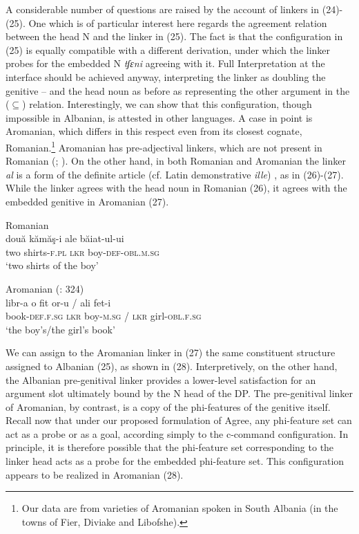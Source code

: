\documentclass[output=paper]{langsci/langscibook}
\begin{document}
A considerable number of questions are raised by the account of linkers in (24)-(25). One which is of particular interest here regards the agreement relation between the head N and the linker in (25). The fact is that the configuration in (25) is equally compatible with a different derivation, under which the linker probes for the embedded N \textit{tʃɛni} agreeing with it. Full Interpretation at the interface should be achieved anyway, interpreting the linker as doubling the genitive – and the head noun as before as representing the other argument in the ($\subseteq$) relation. Interestingly, we can show that this configuration, though impossible in Albanian, is attested in other languages. A case in point is Aromanian, which differs in this respect even from its closest cognate, Romanian.\footnote{Our data are from varieties of Aromanian spoken in South Albania (in the towns of Fier, Diviake and Libofshe).} Aromanian has pre-adjectival linkers, which are not present in Romanian (\citealt{Campos2008}; \citealt{Cornilescu2013}). On the other hand, in both Romanian and Aromanian the linker \textit{al} is a form of the definite article (cf. Latin demonstrative \textit{ille}) \citep{Giurgea2012}, as in (26)-(27). While the linker agrees with the head noun in Romanian (26), it agrees with the embedded genitive in Aromanian (27).

\ea%
         Romanian\label{ex:manzini:26}\\
    \gll două   kămăş-i   ale   băiat-ul-ui     \\
         two   shirts-\textsc{f.pl}  \textsc{lkr}  boy-\textsc{def-obl.m.sg}   \\
    \glt ‘two shirts of the boy’ 
    \z


\ea%
         Aromanian (\citealt{Franco2015}: 324) \label{ex:manzini:27}\\
    \gll libr-a       o   {fit or-u} /  ali   fet-i     \\
         book-\textsc{def.f.sg}   \textsc{lkr}  boy\textsc{{}-m.sg} /   \textsc{lkr}  girl-\textsc{obl.f.sg}   \\
    \glt ‘the boy’s/the girl’s book’
    \z


We can assign to the Aromanian linker in (27) the same constituent structure assigned to Albanian (25), as shown in (28). Interpretively, on the other hand, the Albanian pre-genitival linker provides a lower-level satisfaction for an argument slot ultimately bound by the N head of the DP. The pre-genitival linker of Aromanian, by contrast, is a copy of the phi-features of the genitive itself. Recall now that under our proposed formulation of Agree, any phi-feature set can act as a probe or as a goal, according simply to the c-command configuration. In principle, it is therefore possible that the phi-feature set corresponding to the linker head acts as a probe for the embedded phi-feature set. This configuration appears to be realized in Aromanian (28).
\end{document}
